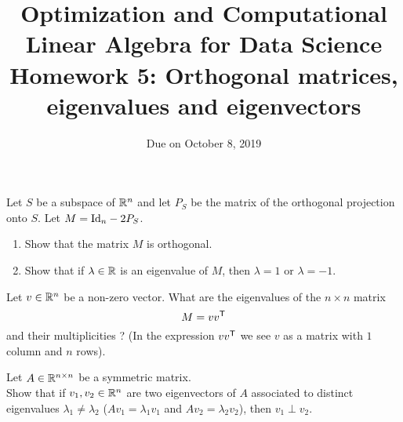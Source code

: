 \documentclass[11pt,nocut]{article}
\title{\vspace{-2.0cm}%
	Optimization and Computational Linear Algebra for Data Science\\
Homework 5: Orthogonal matrices, eigenvalues and eigenvectors}
\date{\vspace{-1cm}Due on October 8, 2019}
\begin{document}
\maketitle


\begin{problem}[2 points]
	Let $S$ be a subspace of $\mathbb{R}^n$ and let $P_S$ be the matrix of the orthogonal projection onto $S$. Let $M = {{\rm Id}}_n - 2 P_S$.
	\begin{enumerate}[label=\normalfont(\textbf{\alph*})]
		\item Show that the matrix $M$ is orthogonal.
		\item Show that if $\lambda \in \mathbb{R}$ is an eigenvalue of $M$, then $\lambda = 1$ or $\lambda=-1$.
	\end{enumerate}
\end{problem}

\vspace{1mm}


\begin{problem}[2 points]
	Let $v \in \mathbb{R}^n$ be a non-zero vector. What are the eigenvalues of the $n \times n$ matrix
	$$
		M = v v^{{\sf T}}
	$$
	and their multiplicities ? (In the expression $vv^{{\sf T}}$ we see $v$ as a matrix with $1$ column and $n$ rows).
\end{problem}

\vspace{1mm}
\begin{problem}[2 points]
	Let $A \in \mathbb{R}^{n \times n}$ be a symmetric matrix.
	\\
	Show that if $v_1, v_2 \in \mathbb{R}^n$ are two eigenvectors of $A$ associated to distinct eigenvalues $\lambda_1 \neq \lambda_2$ ($Av_1 = \lambda_1 v_1$ and $Av_2 = \lambda_2 v_2$), then $v_1 \perp v_2$.
\end{problem}



\vspace{1mm}


\end{document}
